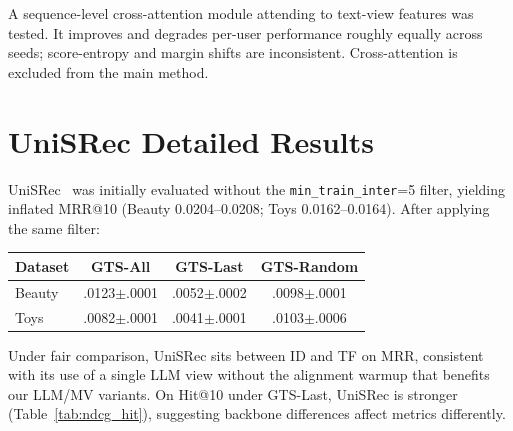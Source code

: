 \documentclass[sigconf,natbib=true,anonymous]{acmart}
\begin{document}
A sequence-level cross-attention module attending to text-view features was tested.
It improves and degrades per-user performance roughly equally across seeds; score-entropy and margin shifts are inconsistent.
Cross-attention is excluded from the main method.

\section{UniSRec Detailed Results}
\label{app:unisrec}

UniSRec~\cite{hou2022unisrec} was initially evaluated without the \texttt{min\_train\_inter}=5 filter, yielding inflated MRR@10 (Beauty 0.0204--0.0208; Toys 0.0162--0.0164).
After applying the same filter:

\begin{table}[h]
\centering
\small
\begin{tabular}{@{}lccc@{}}
\toprule
Dataset & GTS-All & GTS-Last & GTS-Random \\
\midrule
Beauty & .0123$\pm$.0001 & .0052$\pm$.0002 & .0098$\pm$.0001 \\
Toys   & .0082$\pm$.0001 & .0041$\pm$.0001 & .0103$\pm$.0006 \\
\bottomrule
\end{tabular}
\end{table}

Under fair comparison, UniSRec sits between ID and TF on MRR, consistent with its use of a single LLM view without the alignment warmup that benefits our LLM/MV variants.
On Hit@10 under GTS-Last, UniSRec is stronger (Table~\ref{tab:ndcg_hit}), suggesting backbone differences affect metrics differently.
\end{document}
